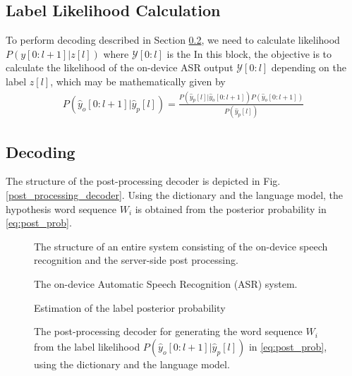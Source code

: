 \documentclass{article}
\begin{document}
\subsection{Label Likelihood Calculation}
To perform decoding described in Section \ref{sec:decoding}, 
we need to calculate likelihood $P(y[0:l+1] |z[l])$
where $\mathcal{Y}[0:l]$ is the 
In this block, the objective is to calculate the likelihood
of the on-device ASR output $\mathcal{Y}[0:l]$ depending on 
the label $z[l]$, which may be mathematically given
by
\begin{align}
  P(\hat{y}_o[0:l+1] \big| \hat{y}_p[l]) 
    = \frac{P(\hat{y}_p[l] \big| \hat{y}_o[0:l+1])
        P\left(\hat{y}_o[0:l+1] \right)}{P(\hat{y}_p[l])}
  \label{eq:post_prob}
\end{align}

\subsection{Decoding}
\label{sec:decoding}
The structure of the post-processing decoder is depicted in Fig.
\ref{post_processing_decoder}. Using the dictionary and the
language model, the hypothesis word sequence $W_i$ is obtained
from the posterior probability in \eqref{eq:post_prob}.


\begin{figure}
  \centering
    \centering
    \resizebox{130mm}{!}{
      
    }
    \caption {
      The structure of an entire system consisting of the on-device speech 
      recognition and the server-side post processing. 
      \label{fig:entire_system}
    }
\end{figure}


\begin{figure}
  \centering
    \centering
    \resizebox{55mm}{!}{
      
    }
    \caption {
      The on-device Automatic Speech Recognition (ASR) system.
      \label{fig:asr_system}
    }
\end{figure}


\begin{figure}
    \centering
    \resizebox{30mm}{!}{
      
    } 
    \caption {
      Estimation of the label posterior probability
      \label{fig:label_posterior_prob_estimation}
    }
\end{figure}


\begin{figure}
    \centering
    \resizebox{70mm}{!}{
      
    } 
    \caption {
      The post-processing decoder for generating the word sequence $W_i$
      from the label likelihood $P(\hat{y}_o[0:l+1] | \hat{y}_p[l])$ in \eqref{eq:post_prob}, 
      using the dictionary and the language model.
      \label{fig:post_processing_decoder}
    }
\end{figure}
\end{document}
